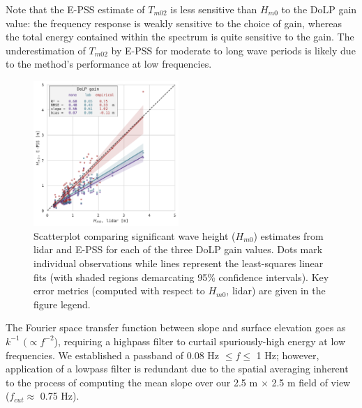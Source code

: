 \documentclass[letterpaper,journal]{IEEEtran}
\begin{document}
Note that the E-PSS estimate of $T_{m02}$ is less sensitive than $H_{m0}$ to the DoLP gain value: the frequency response is weakly sensitive to the choice of gain, whereas the total energy contained within the spectrum is quite sensitive to the gain. The underestimation of $T_{m02}$ by E-PSS for moderate to long wave periods is likely due to the method's performance at low frequencies.

\begin{figure}[!ht]
    \centering
    \includegraphics[width=0.49\textwidth]{_figures/Hm0_comparison_lidar_epss.pdf}
    \vspace{-20pt}
    \caption{Scatterplot comparing significant wave height ($H_{m0}$) estimates from lidar and E-PSS for each of the three DoLP gain values. Dots mark individual observations while lines represent the least-squares linear fits (with shaded regions demarcating 95\% confidence intervals). Key error metrics (computed with respect to $H_{m0}$, lidar) are given in the figure legend.}
    \vspace{-10pt}
    \label{fig:Hm0_comparison_lidar_epss}
\end{figure}

The Fourier space transfer function between slope and surface elevation goes as $k^{-1}$ $(\propto f^{-2}$), requiring a highpass filter to curtail spuriously-high energy at low frequencies. We established a passband of 0.08 Hz $\le f \le$ 1 Hz; however, application of a lowpass filter is redundant due to the spatial averaging inherent to the process of computing the mean slope over our 2.5 m $\times$ 2.5 m field of view ($f_{cut}\approx$ 0.75 Hz).
\end{document}
